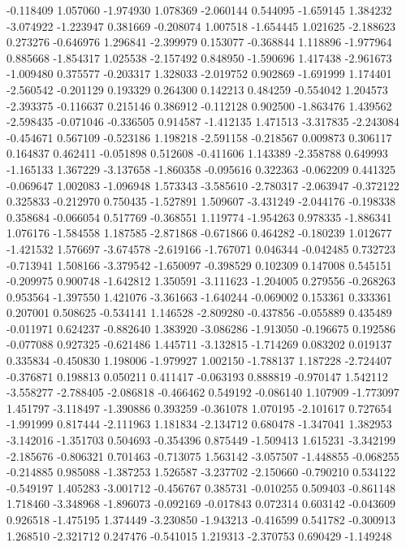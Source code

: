 -0.118409
1.057060
-1.974930
1.078369
-2.060144
0.544095
-1.659145
1.384232
-3.074922
-1.223947
0.381669
-0.208074
1.007518
-1.654445
1.021625
-2.188623
0.273276
-0.646976
1.296841
-2.399979
0.153077
-0.368844
1.118896
-1.977964
0.885668
-1.854317
1.025538
-2.157492
0.848950
-1.590696
1.417438
-2.961673
-1.009480
0.375577
-0.203317
1.328033
-2.019752
0.902869
-1.691999
1.174401
-2.560542
-0.201129
0.193329
0.264300
0.142213
0.484259
-0.554042
1.204573
-2.393375
-0.116637
0.215146
0.386912
-0.112128
0.902500
-1.863476
1.439562
-2.598435
-0.071046
-0.336505
0.914587
-1.412135
1.471513
-3.317835
-2.243084
-0.454671
0.567109
-0.523186
1.198218
-2.591158
-0.218567
0.009873
0.306117
0.164837
0.462411
-0.051898
0.512608
-0.411606
1.143389
-2.358788
0.649993
-1.165133
1.367229
-3.137658
-1.860358
-0.095616
0.322363
-0.062209
0.441325
-0.069647
1.002083
-1.096948
1.573343
-3.585610
-2.780317
-2.063947
-0.372122
0.325833
-0.212970
0.750435
-1.527891
1.509607
-3.431249
-2.044176
-0.198338
0.358684
-0.066054
0.517769
-0.368551
1.119774
-1.954263
0.978335
-1.886341
1.076176
-1.584558
1.187585
-2.871868
-0.671866
0.464282
-0.180239
1.012677
-1.421532
1.576697
-3.674578
-2.619166
-1.767071
0.046344
-0.042485
0.732723
-0.713941
1.508166
-3.379542
-1.650097
-0.398529
0.102309
0.147008
0.545151
-0.209975
0.900748
-1.642812
1.350591
-3.111623
-1.204005
0.279556
-0.268263
0.953564
-1.397550
1.421076
-3.361663
-1.640244
-0.069002
0.153361
0.333361
0.207001
0.508625
-0.534141
1.146528
-2.809280
-0.437856
-0.055889
0.435489
-0.011971
0.624237
-0.882640
1.383920
-3.086286
-1.913050
-0.196675
0.192586
-0.077088
0.927325
-0.621486
1.445711
-3.132815
-1.714269
0.083202
0.019137
0.335834
-0.450830
1.198006
-1.979927
1.002150
-1.788137
1.187228
-2.724407
-0.376871
0.198813
0.050211
0.411417
-0.063193
0.888819
-0.970147
1.542112
-3.558277
-2.788405
-2.086818
-0.466462
0.549192
-0.086140
1.107909
-1.773097
1.451797
-3.118497
-1.390886
0.393259
-0.361078
1.070195
-2.101617
0.727654
-1.991999
0.817444
-2.111963
1.181834
-2.134712
0.680478
-1.347041
1.382953
-3.142016
-1.351703
0.504693
-0.354396
0.875449
-1.509413
1.615231
-3.342199
-2.185676
-0.806321
0.701463
-0.713075
1.563142
-3.057507
-1.448855
-0.068255
-0.214885
0.985088
-1.387253
1.526587
-3.237702
-2.150660
-0.790210
0.534122
-0.549197
1.405283
-3.001712
-0.456767
0.385731
-0.010255
0.509403
-0.861148
1.718460
-3.348968
-1.896073
-0.092169
-0.017843
0.072314
0.603142
-0.043609
0.926518
-1.475195
1.374449
-3.230850
-1.943213
-0.416599
0.541782
-0.300913
1.268510
-2.321712
0.247476
-0.541015
1.219313
-2.370753
0.690429
-1.149248
